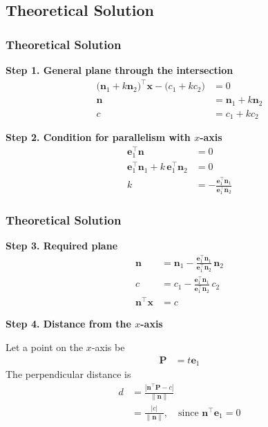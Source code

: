 \documentclass{beamer}
\theoremstyle{remark}
\let\vec\mathbf
\numberwithin{equation}{section}
\begin{document}
\subsection{Theoretical Solution }
\begin{frame}
\frametitle{Theoretical Solution}
\textbf{Step 1. General plane through the intersection}
\begin{align}
\big(\vec{n}_1 + k \vec{n}_2\big)^\top \vec{x} - \big(c_1 + k c_2\big) &= 0 \\
\vec{n} &= \vec{n}_1 + k \vec{n}_2 \\
c &= c_1 + k c_2
\end{align}

\textbf{Step 2. Condition for parallelism with $x$-axis}
\begin{align}
\vec{e}_1^\top \vec{n} &= 0 \\
\vec{e}_1^\top \vec{n}_1 + k\, \vec{e}_1^\top \vec{n}_2 &= 0 \\
k &= -\frac{\vec{e}_1^\top \vec{n}_1}{\vec{e}_1^\top \vec{n}_2}
\end{align}

\end{frame}

\begin{frame}
\frametitle{Theoretical Solution}
\textbf{Step 3. Required plane}
\begin{align}
\vec{n} &= \vec{n}_1 - \frac{\vec{e}_1^\top \vec{n}_1}{\vec{e}_1^\top \vec{n}_2}\,\vec{n}_2 \\
c &= c_1 - \frac{\vec{e}_1^\top \vec{n}_1}{\vec{e}_1^\top \vec{n}_2}\,c_2 \\
\vec{n}^\top \vec{x} &= c
\end{align}

\textbf{Step 4. Distance from the $x$-axis}

Let a point on the $x$-axis be
\begin{align}
\vec{P} &= t \vec{e}_1
\end{align}
The perpendicular distance is
\begin{align}
d &= \frac{\left|\vec{n}^\top \vec{P} - c\right|}{\|\vec{n}\|} \\
&= \frac{|c|}{\|\vec{n}\|}, \quad \text{since } \vec{n}^\top \vec{e}_1 = 0
\end{align}

\end{frame}
\end{document}
